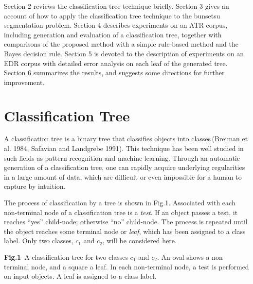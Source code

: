 Section 2 reviews the classification tree technique briefly. Section 3 
gives an
account of how to apply the classification tree technique to the 
bunsetsu segmentation problem. Section 4 describes experiments on an
ATR corpus, including generation and evaluation of a classification
tree,
together with  comparisons of the proposed method with a  simple rule-based
method and the Bayes decision
rule. Section 5 is
devoted to the description of experiments on an EDR corpus with 
detailed error analysis on each leaf of the generated tree.
Section 6 summarizes the results, and suggests some directions for
further improvement.
\section{Classification Tree}
A classification tree is a binary tree that classifies objects
into classes\,(Breiman et al. 1984, Safavian and Landgrebe 1991). This technique has been well studied 
in such fields as pattern recognition and machine learning.
Through an automatic generation of a classification tree,
one can rapidly acquire underlying regularities in a large amount of
data,
which are difficult or even impossible for a human to capture by
intuition.
 
The process of classification by a tree is shown in Fig.1.
Associated with each non-terminal node of a classification tree is a 
{\it test}.
If an object passes a test, it reaches ``yes'' 
child-node; otherwise ``no'' child-node.
The process is repeated until the 
object reaches some terminal node or
{\em leaf},  which has been assigned to a class label.
Only two classes, $c_{1}$ and $c_{2}$, will be considered here.
\begin{center}
\end{center}
\begin{center}
\vspace{-30mm}
{\bf Fig.1}\ A classification tree for two classes $c_{1}$ and
$c_{2}$. An oval shows a non-terminal node, and a square a leaf. In
each non-terminal node, a test is performed on input objects. A leaf is assigned to a
class label.\vspace*{3mm}\\
\end{center}

